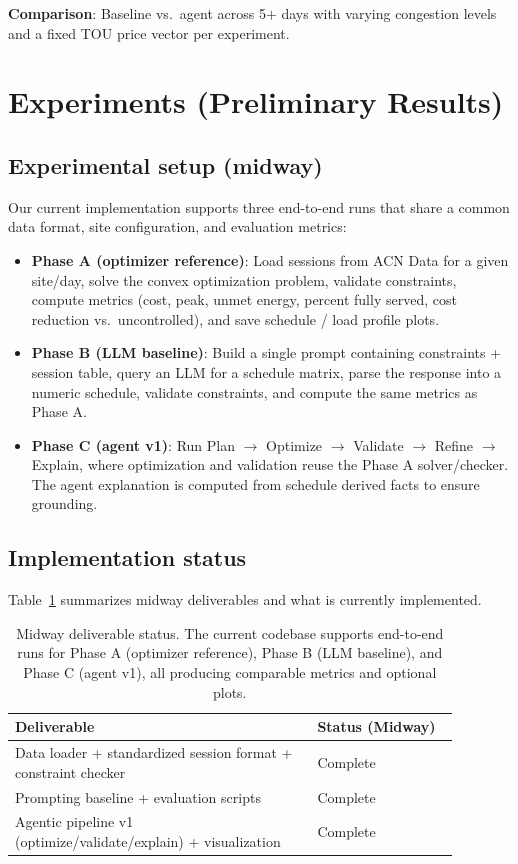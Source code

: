 \documentclass{article}
\begin{document}
\textbf{Comparison}: Baseline vs.\ agent across 5$+$ days with varying congestion levels and a fixed TOU price vector per experiment.

\section{Experiments (Preliminary Results)}
\subsection{Experimental setup (midway)}
Our current implementation supports three end-to-end runs that share a common data format, site configuration, and evaluation metrics:
\begin{itemize}
  \item \textbf{Phase A (optimizer reference)}: Load sessions from ACN Data for a given site/day, solve the convex optimization problem, validate constraints, compute metrics (cost, peak, unmet energy, percent fully served, cost reduction vs.\ uncontrolled), and save schedule / load profile plots.
  \item \textbf{Phase B (LLM baseline)}: Build a single prompt containing constraints + session table, query an LLM for a schedule matrix, parse the response into a numeric schedule, validate constraints, and compute the same metrics as Phase A.
  \item \textbf{Phase C (agent v1)}: Run Plan $\rightarrow$ Optimize $\rightarrow$ Validate $\rightarrow$ Refine $\rightarrow$ Explain, where optimization and validation reuse the Phase A solver/checker. The agent explanation is computed from schedule derived facts to ensure grounding.
\end{itemize}

\subsection{Implementation status}
Table~\ref{tab:midway_status} summarizes midway deliverables and what is currently implemented.

\begin{table}[t]
\centering
\begin{tabular}{p{0.60\linewidth}p{0.28\linewidth}}
\toprule
\textbf{Deliverable} & \textbf{Status (Midway)} \\
\midrule
Data loader + standardized session format + constraint checker & Complete \\
Prompting baseline + evaluation scripts & Complete \\
Agentic pipeline v1 (optimize/validate/explain) + visualization & Complete \\
\bottomrule
\end{tabular}
\caption{Midway deliverable status. The current codebase supports end-to-end runs for Phase A (optimizer reference), Phase B (LLM baseline), and Phase C (agent v1), all producing comparable metrics and optional plots.}
\label{tab:midway_status}
\end{table}
\end{document}
